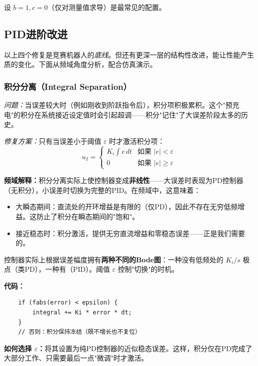 设 $b = 1, c = 0$（仅对测量值求导）是最常见的配置。

\subsection{PID进阶改进}

以上四个修复是竞赛机器人的\textit{底线}。但还有更深一层的结构性改进，能让性能产生质的变化。下面从频域角度分析，配合仿真演示。

\subsubsection{积分分离（Integral Separation）}

\textit{问题：}当误差较大时（例如刚收到阶跃指令后），积分项积极累积。这个"预充电"的积分在系统接近设定值时会引起超调——积分"记住"了大误差阶段太多的历史。

\textit{修复方案：}只有当误差小于阈值 $\varepsilon$ 时才激活积分项：
\begin{equation}
u_I = \begin{cases} K_i \int e \, dt & \text{如果 } |e| < \varepsilon \\ 0 & \text{如果 } |e| \geq \varepsilon \end{cases}
\end{equation}

\textbf{频域解释：}积分分离实际上使控制器变成\textbf{非线性}——大误差时表现为PD控制器（无积分），小误差时切换为完整的PID。在频域中，这意味着：
\begin{itemize}
    \item 大瞬态期间：直流处的开环增益是有限的（仅PD），因此不存在无穷低频增益。这防止了积分在瞬态期间的"饱和"。
    \item 接近稳态时：积分激活，提供无穷直流增益和零稳态误差——正是我们需要的。
\end{itemize}

控制器实际上根据误差幅度拥有\textbf{两种不同的Bode图}：一种没有低频处的 $K_i/s$ 极点（类PD），一种有（PID）。阈值 $\varepsilon$ 控制"切换"的时机。

\textbf{代码：}
\begin{verbatim}
    if (fabs(error) < epsilon) {
        integral += Ki * error * dt;
    }
    // 否则：积分保持冻结（既不增长也不复位）
\end{verbatim}

\textbf{如何选择 $\varepsilon$：}将其设置为纯PD控制器的近似稳态误差。这样，积分仅在PD完成了大部分工作、只需要最后一点"微调"时才激活。

